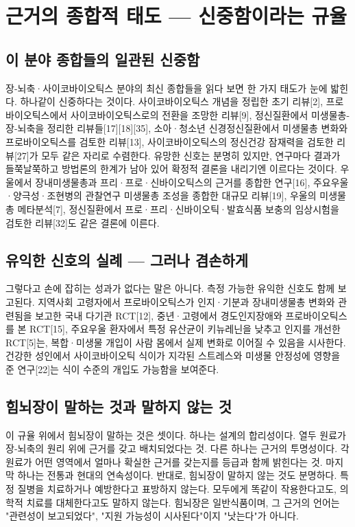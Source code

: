 \documentclass[12pt,oneside]{book}
\begin{document}
\section{근거의 종합적 태도 — 신중함이라는 규율}

\subsection{이 분야 종합들의 일관된 신중함}

장-뇌축·사이코바이오틱스 분야의 최신 종합들을 읽다 보면 한 가지 태도가 눈에 밟힌다. 하나같이 신중하다는 것이다. 사이코바이오틱스 개념을 정립한 초기 리뷰[2], 프로바이오틱스에서 사이코바이오틱스로의 전환을 조망한 리뷰[9], 정신질환에서 미생물총-장-뇌축을 정리한 리뷰들[17][18][35], 소아·청소년 신경정신질환에서 미생물총 변화와 프로바이오틱스를 검토한 리뷰[13], 사이코바이오틱스의 정신건강 잠재력을 검토한 리뷰[27]가 모두 같은 자리로 수렴한다. 유망한 신호는 분명히 있지만, 연구마다 결과가 들쭉날쭉하고 방법론의 한계가 남아 있어 확정적 결론을 내리기엔 이르다는 것이다. 우울에서 장내미생물총과 프리·프로·신바이오틱스의 근거를 종합한 연구[16], 주요우울·양극성·조현병의 관찰연구 미생물총 조성을 종합한 대규모 리뷰[19], 우울의 미생물총 메타분석[7], 정신질환에서 프로·프리·신바이오틱·발효식품 보충의 임상시험을 검토한 리뷰[32]도 같은 결론에 이른다.

\subsection{유익한 신호의 실례 — 그러나 겸손하게}

그렇다고 손에 잡히는 성과가 없다는 말은 아니다. 측정 가능한 유익한 신호도 함께 보고된다. 지역사회 고령자에서 프로바이오틱스가 인지·기분과 장내미생물총 변화와 관련됨을 보고한 국내 다기관 RCT[12], 중년·고령에서 경도인지장애와 프로바이오틱스를 본 RCT[15], 주요우울 환자에서 특정 유산균이 키뉴레닌을 낮추고 인지를 개선한 RCT[5]는, 복합·미생물 개입이 사람 몸에서 실제 변화로 이어질 수 있음을 시사한다. 건강한 성인에서 사이코바이오틱 식이가 지각된 스트레스와 미생물 안정성에 영향을 준 연구[22]는 식이 수준의 개입도 가능함을 보여준다.

\subsection{힘뇌장이 말하는 것과 말하지 않는 것}

이 규율 위에서 힘뇌장이 말하는 것은 셋이다. 하나는 설계의 합리성이다. 열두 원료가 장-뇌축의 원리 위에 근거를 갖고 배치되었다는 것. 다른 하나는 근거의 투명성이다. 각 원료가 어떤 영역에서 얼마나 확실한 근거를 갖는지를 등급과 함께 밝힌다는 것. 마지막 하나는 전통과 현대의 연속성이다. 반대로, 힘뇌장이 말하지 않는 것도 분명하다. 특정 질병을 치료하거나 예방한다고 표방하지 않는다. 모두에게 똑같이 작용한다고도, 의학적 치료를 대체한다고도 말하지 않는다. 힘뇌장은 일반식품이며, 그 근거의 언어는 "관련성이 보고되었다", "지원 가능성이 시사된다"이지 "낫는다"가 아니다.
\end{document}

